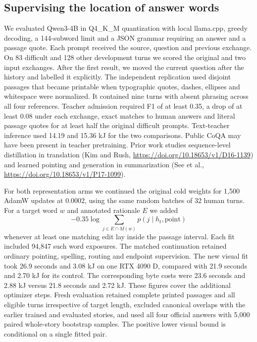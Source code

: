 \subsection*{Supervising the location of answer words}
We evaluated Qwen3-4B in Q4\_K\_M quantization with local llama.cpp, greedy decoding, a 144-subword limit and a JSON grammar requiring an answer and a passage quote. Each prompt received the source, question and previous exchange. On 83 difficult and 128 other development turns we scored the original and two input exchanges. After the first result, we moved the current question after the history and labelled it explicitly. The independent replication used disjoint passages that became printable when typographic quotes, dashes, ellipses and whitespace were normalized. It contained nine turns with absent phrasing across all four references. Teacher admission required F1 of at least 0.35, a drop of at least 0.08 under each exchange, exact matches to human answers and literal passage quotes for at least half the original difficult prompts. Text-teacher inference used 14.19 and 15.36 kJ for the two comparisons. Public CoQA may have been present in teacher pretraining. Prior work studies sequence-level distillation in translation (Kim and Rush, \url{https://doi.org/10.18653/v1/D16-1139}) and learned pointing and generation in summarization (See et al., \url{https://doi.org/10.18653/v1/P17-1099}).

For both representation arms we continued the original cold weights for 1,500 AdamW updates at 0.0002, using the same random batches of 32 human turns. For a target word $w$ and annotated rationale $E$ we added
\[
 -0.35\log\sum_{j\in E\cap M(w)}p(j\mid h_t,\mathrm{point})
\]
whenever at least one matching edit lay inside the passage interval. Each fit included 94,847 such word exposures. The matched continuation retained ordinary pointing, spelling, routing and endpoint supervision. The new visual fit took 26.9 seconds and 3.08 kJ on one RTX 4090 D, compared with 21.9 seconds and 2.70 kJ for its control. The corresponding byte costs were 23.6 seconds and 2.88 kJ versus 21.8 seconds and 2.72 kJ. These figures cover the additional optimizer steps. Fresh evaluation retained complete printed passages and all eligible turns irrespective of target length, excluded canonical overlaps with the earlier trained and evaluated stories, and used all four official answers with 5,000 paired whole-story bootstrap samples. The positive lower visual bound is conditional on a single fitted pair.

